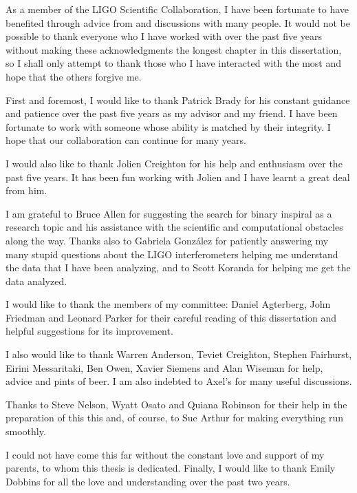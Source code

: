 
As a member of the LIGO Scientific Collaboration, I have been fortunate to
have benefited through advice from and discussions with many people. It would
not be possible to thank everyone who I have worked with over the past five
years without making these acknowledgments the longest chapter in this
dissertation, so I shall only attempt to thank those who I have interacted
with the most and hope that the others forgive me.

First and foremost, I would like to thank Patrick Brady for his constant
guidance and patience over the past five years as my advisor and my friend. I
have been fortunate to work with someone whose ability is matched by their
integrity. I hope that our collaboration can continue for many years.

I would also like to thank Jolien Creighton for his help and enthusiasm over
the past five years. It has been fun working with Jolien and I have learnt a
great deal from him.

I am grateful to Bruce Allen for suggesting the search for binary inspiral as
a research topic and his assistance with the scientific and computational
obstacles along the way. Thanks also to Gabriela Gonz\'{a}lez for patiently
answering my many stupid questions about the LIGO interferometers helping me
understand the data that I have been analyzing, and to Scott Koranda for
helping me get the data analyzed.

I would like to thank the members of my committee: Daniel Agterberg, John
Friedman and Leonard Parker for their careful reading of this dissertation and
helpful suggestions for its improvement.

I also would like to thank Warren Anderson, Teviet Creighton, Stephen
Fairhurst, Eirini Messaritaki, Ben Owen, Xavier Siemens and Alan Wiseman for
help, advice and pints of beer. I am also indebted to Axel's for many useful
discussions.

Thanks to Steve Nelson, Wyatt Osato and Quiana Robinson for their help in the
preparation of this this and, of course, to Sue Arthur for making everything
run smoothly.

I could not have come this far without the constant love and support of my
parents, to whom this thesis is dedicated. Finally, I would like to thank
Emily Dobbins for all the love and understanding over the past two years.
